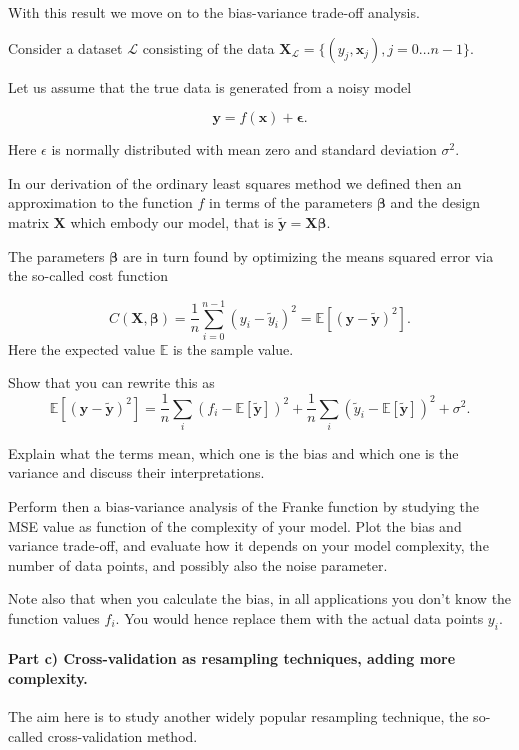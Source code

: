 \documentclass[%
oneside,                 %
final,                   %
10pt]{article}
\begin{document}
With this result we move on to the bias-variance trade-off analysis.

Consider a
dataset $\mathcal{L}$ consisting of the data
$\mathbf{X}_\mathcal{L}=\{(y_j, \boldsymbol{x}_j), j=0\ldots n-1\}$.

Let us assume that the true data is generated from a noisy model

\[
\bm{y}=f(\boldsymbol{x}) + \bm{\epsilon}.
\]

Here $\epsilon$ is normally distributed with mean zero and standard
deviation $\sigma^2$.

In our derivation of the ordinary least squares method we defined then
an approximation to the function $f$ in terms of the parameters
$\bm{\beta}$ and the design matrix $\bm{X}$ which embody our model,
that is $\bm{\tilde{y}}=\bm{X}\bm{\beta}$.

The parameters $\bm{\beta}$ are in turn found by optimizing the means
squared error via the so-called cost function

\[
C(\bm{X},\bm{\beta}) =\frac{1}{n}\sum_{i=0}^{n-1}(y_i-\tilde{y}_i)^2=\mathbb{E}\left[(\bm{y}-\bm{\tilde{y}})^2\right].
\]
Here the expected value $\mathbb{E}$ is the sample value. 

Show that you can rewrite  this as
\[
\mathbb{E}\left[(\bm{y}-\bm{\tilde{y}})^2\right]=\frac{1}{n}\sum_i(f_i-\mathbb{E}\left[\bm{\tilde{y}}\right])^2+\frac{1}{n}\sum_i(\tilde{y}_i-\mathbb{E}\left[\bm{\tilde{y}}\right])^2+\sigma^2.
\]

Explain what the terms mean, which one is the bias and which one is
the variance and discuss their interpretations.

Perform then a bias-variance analysis of the Franke function by
studying the MSE value as function of the complexity of your model.
Plot the bias and variance trade-off, and evaluate how it depends on
your model complexity, the number of data points, and possibly also
the noise parameter.

Note also that when you calculate the bias, in all applications you
don't know the function values $f_i$. You would hence replace them
with the actual data points $y_i$.

\paragraph{Part c) Cross-validation as resampling techniques, adding more complexity.}
The aim here is to study  another widely popular
resampling technique, the so-called cross-validation method.
\end{document}
